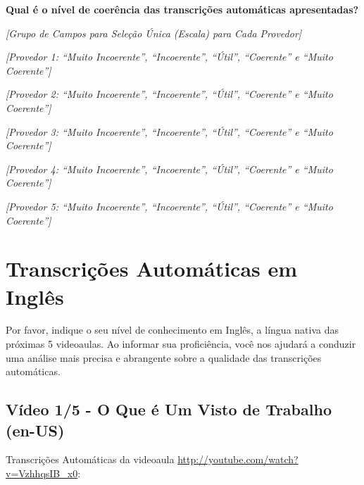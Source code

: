 \noindent
\textbf{Qual é o nível de coerência das transcrições automáticas apresentadas?}

\noindent
\textit{[Grupo de Campos para Seleção Única (Escala) para Cada Provedor]}

\noindent
\textit{[Provedor 1: ``Muito Incoerente'', ``Incoerente'', ``Útil'', ``Coerente'' e ``Muito Coerente'']}

\noindent
\textit{[Provedor 2: ``Muito Incoerente'', ``Incoerente'', ``Útil'', ``Coerente'' e ``Muito Coerente'']}

\noindent
\textit{[Provedor 3: ``Muito Incoerente'', ``Incoerente'', ``Útil'', ``Coerente'' e ``Muito Coerente'']}

\noindent
\textit{[Provedor 4: ``Muito Incoerente'', ``Incoerente'', ``Útil'', ``Coerente'' e ``Muito Coerente'']}

\noindent
\textit{[Provedor 5: ``Muito Incoerente'', ``Incoerente'', ``Útil'', ``Coerente'' e ``Muito Coerente'']}

\section{Transcrições Automáticas em Inglês}

Por favor, indique o seu nível de conhecimento em Inglês, a língua nativa das próximas 5 
videoaulas. Ao informar sua proficiência, você nos ajudará a conduzir uma análise mais 
precisa e abrangente sobre a qualidade das transcrições automáticas.

\subsection{Vídeo 1/5 - O Que é Um Visto de Trabalho (en-US)}

\noindent
Transcrições Automáticas da videoaula \url{http://youtube.com/watch?v=VzhhqsIB_x0}:

